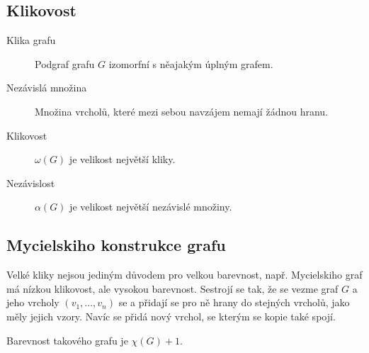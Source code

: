 \subsection{Klikovost}

\begin{description}
    \item[Klika grafu] Podgraf grafu $G$ izomorfní s něajakým úplným grafem.
    \item[Nezávislá množina] Množina vrcholů, které mezi sebou navzájem nemají žádnou hranu.
    \item[Klikovost] $\omega(G)$ je velikost největší kliky.
    \item[Nezávislost] $\alpha(G)$ je velikost největší nezávislé množiny.
\end{description}


\subsection{Mycielskiho konstrukce grafu}

Velké kliky nejsou jediným důvodem pro velkou barevnost, např. Mycielskiho graf má nízkou klikovost, ale vysokou barevnost.
Sestrojí se tak, že se vezme graf $G$ a jeho vrcholy $(v_1, \dots, v_n)$ se  a přidají se pro ně hrany do stejných vrcholů, jako měly jejich vzory.
Navíc se přidá nový vrchol, se kterým se kopie také spojí.

Barevnost takového grafu je $\chi(G) + 1$. 
